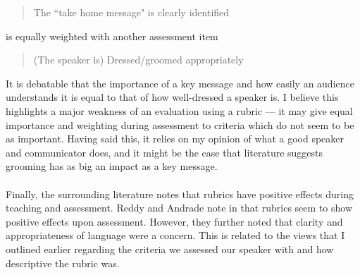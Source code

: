 \begin{quote}
	The ``take home message" is clearly identified
\end{quote}
is equally weighted with another assessment item
\begin{quote}
	(The speaker is) Dressed/groomed appropriately
\end{quote}

It is debatable that the importance of a key message and how easily an audience understands it is
equal to that of how well-dressed a speaker is.
I believe this highlights a major weakness of an evaluation using a rubric --- it may give equal
importance and weighting during assessment to criteria which do not seem to be as important.
Having said this, it relies on my opinion of what a good speaker and communicator does, and it might
be the case that literature suggests grooming has as big an impact as a key message.\\
\\
Finally, the surrounding literature notes that rubrics have positive effects during teaching and
assessment.
Reddy and Andrade note in \cite{reddy2010review} that rubrics seem to show positive effects upon
assessment.
However, they further noted that clarity and appropriateness of language were a concern.
This is related to the views that I outlined earlier regarding the criteria we assessed our speaker
with and how descriptive the rubric was.
